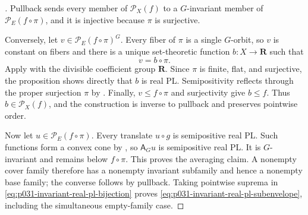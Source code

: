 
\begin{proof}[]
Pullback sends every member of $\mathcal P_X(f)$ to a $G$-invariant member
of $\mathcal P_E(f\circ\pi)$, and it is injective because $\pi$ is
surjective.

Conversely, let $v\in\mathcal P_E(f\circ\pi)^G$.  Every fiber of $\pi$ is a
single $G$-orbit, so $v$ is constant on fibers and there is a unique
set-theoretic function $b:X\to\mathbf R$ such that
\begin{equation}
\label{eq:p031-invariant-real-pl-descends}
                              v=b\circ\pi.
\end{equation}
Apply \cite[Proposition~5.11]{GJR26} with the divisible coefficient group
$\mathbf R$.  Since $\pi$ is finite, flat, and surjective, the proposition
shows directly that $b$ is real PL.  Semipositivity reflects through the
proper surjection $\pi$ by
\cite[Proposition~7.6\textup{(1')}]{GJR26}.  Finally,
$v\leq f\circ\pi$ and surjectivity give $b\leq f$.  Thus
$b\in\mathcal P_X(f)$, and the construction is inverse to pullback and
preserves pointwise order.

Now let $u\in\mathcal P_E(f\circ\pi)$.  Every translate $u\circ g$ is
semipositive real PL.  Such functions form a convex cone by
\cite[\S7.3\textup{(5)}]{GJR26}, so $\mathsf A_Gu$ is semipositive real PL.
It is $G$-invariant and remains below $f\circ\pi$.  This proves the averaging
claim.  A nonempty cover family therefore has a nonempty invariant subfamily
and hence a nonempty base family; the converse follows by pullback.  Taking
pointwise suprema in \eqref{eq:p031-invariant-real-pl-bijection} proves
\eqref{eq:p031-invariant-real-pl-subenvelope}, including the simultaneous
empty-family case.
\end{proof}

